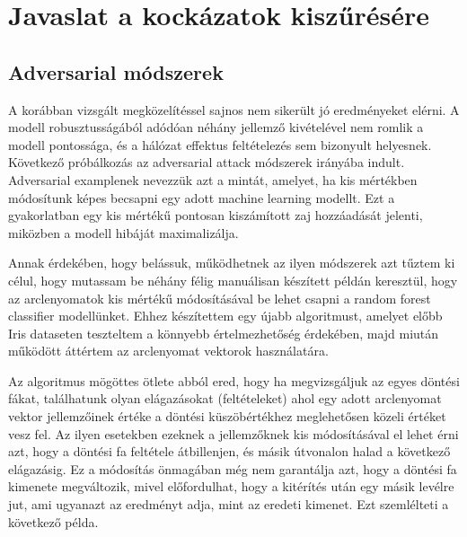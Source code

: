 \section{Javaslat a kockázatok kiszűrésére}
\label{sec:6}


\subsection{Adversarial módszerek}

A korábban vizsgált megközelítéssel sajnos nem sikerült jó eredményeket elérni. A modell robusztusságából adódóan néhány jellemző kivételével nem romlik a modell pontossága, és a hálózat effektus feltételezés sem bizonyult helyesnek. Következő próbálkozás az adversarial attack módszerek irányába indult. Adversarial examplenek nevezzük azt a mintát, amelyet, ha kis mértékben módosítunk képes becsapni egy adott machine learning modellt. Ezt a gyakorlatban egy kis mértékű pontosan kiszámított zaj hozzáadását jelenti, miközben a modell hibáját maximalizálja. 

Annak érdekében, hogy belássuk, működhetnek az ilyen módszerek azt tűztem ki célul, hogy mutassam be néhány félig manuálisan készített példán keresztül, hogy az arclenyomatok kis mértékű módosításával be lehet csapni a random forest classifier modellünket. Ehhez készítettem egy újabb algoritmust, amelyet előbb Iris dataseten teszteltem a könnyebb értelmezhetőség érdekében, majd miután működött áttértem az arclenyomat vektorok használatára.

Az algoritmus mögöttes ötlete abból ered, hogy ha megvizsgáljuk az egyes döntési fákat, találhatunk olyan elágazásokat (feltételeket) ahol egy adott arclenyomat vektor jellemzőinek értéke a döntési küszöbértékhez meglehetősen közeli értéket vesz fel. Az ilyen esetekben ezeknek a jellemzőknek kis módosításával el lehet érni azt, hogy a döntési fa feltétele átbillenjen, és másik útvonalon halad a következő elágazásig. Ez a módosítás önmagában még nem garantálja azt, hogy a döntési fa kimenete megváltozik, mivel előfordulhat, hogy a kitérítés után egy másik levélre jut, ami ugyanazt az eredményt adja, mint az eredeti kimenet. Ezt szemlélteti a következő példa.

